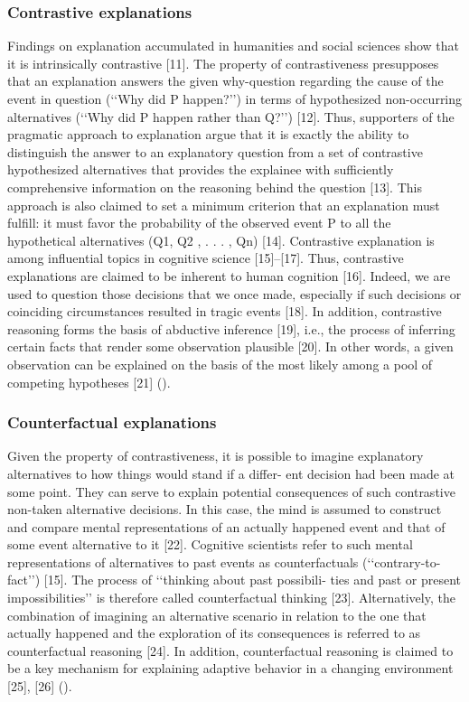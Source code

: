 \documentclass[binding=0.6cm]{sapthesis}
\newcommand{\mycite}[1]{(\cite{#1})}
\begin{document}
\subsubsection{Contrastive explanations}
\label{sec:bg.xai.contrastive}
Findings on explanation accumulated in humanities and social sciences show that it is intrinsically contrastive [11]. The property of contrastiveness presupposes that an explanation answers the given why-question regarding the cause of the event in question (‘‘Why did P happen?’’) in terms of hypothesized non-occurring alternatives (‘‘Why did P happen rather than Q?’’) [12]. Thus, supporters of the pragmatic approach to explanation argue that it is exactly the ability to distinguish the answer to an explanatory question from a set of contrastive hypothesized alternatives that provides the explainee with sufficiently comprehensive information on the reasoning behind the question [13]. This approach is also claimed to set a minimum criterion that an explanation must fulfill: it must favor the probability of the observed event P to all the hypothetical alternatives (Q1, Q2 , . . . , Qn) [14]. Contrastive explanation is among influential topics in cognitive science [15]–[17]. Thus, contrastive explanations are claimed to be inherent to human cognition [16]. Indeed, we are used to question those decisions that we once made, especially if such decisions or coinciding circumstances resulted in tragic events [18]. In addition, contrastive reasoning forms the basis of abductive inference [19], i.e., the process of inferring certain facts that render some observation plausible [20]. In other words, a given observation can be explained on the basis of the most likely among a pool of competing hypotheses [21] \mycite{stepin2021-xai-cf-contrative-survey}.


\subsubsection{Counterfactual explanations}
\label{sec:bg.xai.counterfactual}
Given the property of contrastiveness, it is possible to imagine
explanatory alternatives to how things would stand if a differ-
ent decision had been made at some point. They can serve to
explain potential consequences of such contrastive non-taken
alternative decisions. In this case, the mind is assumed to
construct and compare mental representations of an actually
happened event and that of some event alternative to it [22].
Cognitive scientists refer to such mental representations of
alternatives to past events as counterfactuals (‘‘contrary-to-
fact’’) [15]. The process of ‘‘thinking about past possibili-
ties and past or present impossibilities’’ is therefore called
counterfactual thinking [23]. Alternatively, the combination
of imagining an alternative scenario in relation to the one that
actually happened and the exploration of its consequences
is referred to as counterfactual reasoning [24]. In addition,
counterfactual reasoning is claimed to be a key mechanism
for explaining adaptive behavior in a changing environment
[25], [26] \mycite{stepin2021-xai-cf-contrative-survey}.
\end{document}
